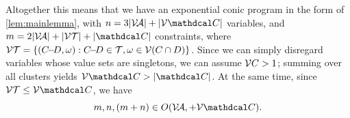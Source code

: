\documentclass{article}
\begin{document}
\begin{lproof}
    Altogether this means that we have an exponential conic program in the form
    of \cref{lem:mainlemma}, with
        $n = 3|\V\!\Ar| + |\V\mathdcal C|$ variables,
        and
        $m = 2 |\V\!\Ar| + |\V \mathcal T| +  |\mathdcal C|$ constraints,
    where
    $\mathcal V\mathcal T = \{ (C\!{-}\!D, \omega) :  C\!{-}\!D \in \mathcal T, \omega \in \mathcal V(C\cap D)\}$.
    Since we can simply disregard variables whose value sets are singletons, we can assume $\mathcal V C > 1$; summing over all clusters yields $\V\mathdcal C > |\mathdcal C|$. 
    At the same time, since $\V\mathcal T \le \V\mathdcal C$, 
    we have 
    \[ m,n,(m + n) \in O(\V\!\Ar, + \V\mathdcal C).  \]


\end{lproof}
\end{document}
